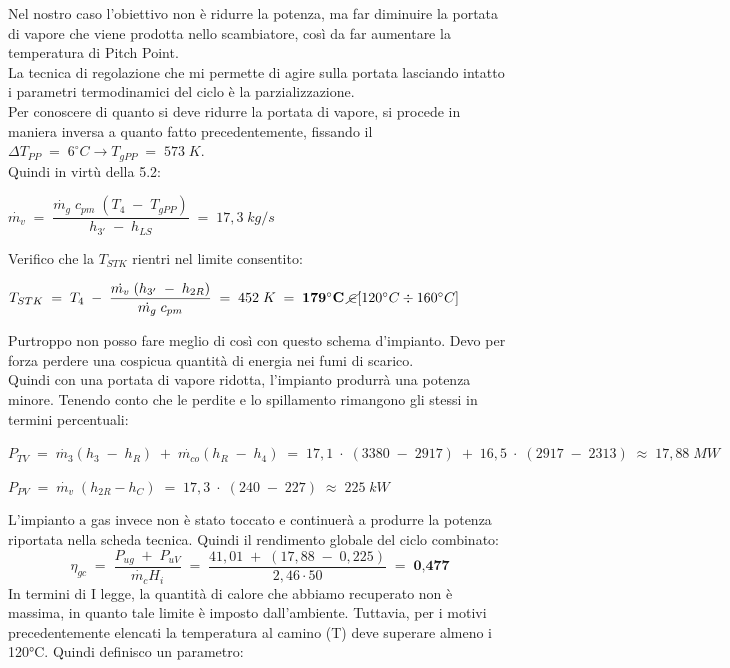 \documentclass[a4paper, twoside, 12pt]{report}
\begin{document}
Nel nostro caso l'obiettivo non è ridurre la potenza, ma far diminuire la portata di vapore che viene prodotta nello scambiatore, così da far aumentare la temperatura di Pitch Point.\\ 
La tecnica di regolazione che mi permette di agire sulla portata lasciando intatto i parametri termodinamici del ciclo è la parzializzazione.\\
Per conoscere di quanto si deve ridurre la portata di vapore, si procede in maniera inversa a quanto fatto precedentemente, fissando il $\Delta T_{PP}\;=\;6^{\circ}C\to T_{gPP}\;=\;573\;K$.\\
Quindi in virtù della 5.2:
\begin{center}
	$\dot{m_{v}}\;=\;\dfrac{\dot{m_{g}}\;c_{pm}\;(T_{4}\;-\;T_{gPP})}{h_{3'}\;-\;h_{LS}}\;=\;17,3\;kg/s$
\end{center}
Verifico che la $T_{STK}$ rientri nel limite consentito:
\begin{center}
	$T_{STK}\;=\;T_{4}\;-\;\dfrac{\dot{m_{v}}\;(h_{3'}\;-\;h_{2R})}{\dot{m_{g}}\;c_{pm}}\;=\;452\;K\;=\;\textbf{179$^{\circ}$C}\;\cancel{\in} [120^{\circ}C\div160^{\circ}C]$
\end{center}
Purtroppo non posso fare meglio di così con questo schema d'impianto. Devo per forza perdere una cospicua quantità di energia nei fumi di scarico.\\
Quindi con una portata di vapore ridotta, l'impianto produrrà una potenza minore. Tenendo conto che le perdite e lo spillamento rimangono gli stessi in termini percentuali:
\begin{center}
	$P_{TV}\;=\;\dot{m_{3}}(h_{3}\;-\;h_{R})\;+\;\dot{m_{co}}(h_{R}\;-\;h_{4})\;=\;17,1\;\cdot\;(3380\;-\;2917)\;+\;16,5\;\cdot\;(2917\;-\;2313)\;\approx\;17,88\;MW$
\end{center}
\begin{center}
	$P_{PV}\;=\;\dot{m_{v}}\;(h_{2R}-h_{C})\;=\;17,3\;\cdot\;(240\;-\;227)\;\approx\;225\;kW$
\end{center}
L'impianto a gas invece non è stato toccato e continuerà a produrre la potenza riportata nella scheda tecnica. Quindi il rendimento globale del ciclo combinato:
\begin{equation}
	\eta_{gc}\;=\;\dfrac{P_{ug}\;+\;P_{uV}}{\dot{m_{c}}H_{i}}\;=\;\dfrac{41,01\;+\;(17,88\;-\;0,225)}{2,46\cdot50}\;=\;\textbf{0,477}
\end{equation}
In termini di I legge, la quantità di calore che abbiamo recuperato non è massima, in quanto tale limite è imposto dall'ambiente. Tuttavia, per i motivi precedentemente elencati la temperatura al camino (T) deve superare almeno i 120°C. Quindi definisco un parametro:
\end{document}
